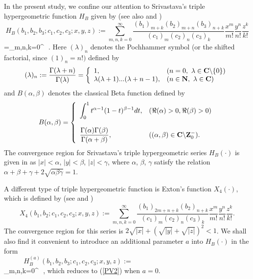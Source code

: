 In the present study, we confine our attention to Srivastava's triple hypergeometric function $H_{B}$ given by \cite[p. 43, 1.5(11) to 1.5(13)]{AB37} (see also \cite{AB34} and \cite[p.~68]{AB36})
\[
H_{B}(b_{1},b_{2},b_{3};c_{1},c_{2},c_{3};x,y,z)
:=\sum_{m,n,k=0}^{\infty}\frac{(b_{1})_{m+k}(b_{2})_{m+n}(b_{3})_{n+k}}{(c_{1})_{m}(c_{2})_{n}(c_{3})_{k}}
\frac{x^{m}}{m!}\frac{y^{n}}{n!}\frac{z^{k}}{k!}\]
\bee\label{PV2}
=\sum_{m,n,k=0}^{\infty}\,\,
.
\ee
Here $(\lambda)_{n}$ denotes the Pochhammer symbol (or the shifted factorial,
 since $(1)_{n}=n!)$  defined by
\[
(\lambda)_n:=\frac{\Gamma(\lambda+n)}{\Gamma(\lambda)}=\left\{\begin{array}{ll}1, & (n=0,\ \lambda\in{\bf C}\backslash\{0\})\\
\lambda(\lambda+1)...(\lambda+n-1),  & (n\in{\bf N},~\lambda\in{\bf C}) 
 \end{array}\right.
\]
and $B(\alpha, \beta)$ denotes the classical Beta function  defined by \cite[(5.12.1)]{AB26}
\begin{equation}\label{ES5}
B(\alpha, \beta)=\left\{\begin{array}{ll} \displaystyle{\int_{0}^{1}t^{\alpha-1}(1-t)^{\beta-1}dt}, & (\Re(\alpha)>0,  \Re(\beta)>0)\\
\\
\displaystyle{\frac{\Gamma(\alpha)\Gamma(\beta)}{\Gamma(\alpha+\beta)}}, & ( (\alpha,\beta)\in{\bf C}\backslash {\bf Z}_{0}^{-}). \end{array}\right.
\end{equation}
The convergence region for Srivastava's triple hypergeometric series $H_{B}(\cdot)$ is given in \cite[ p.243]{ab22}
as $|x|<\alpha$, $|y|<\beta$, $|z|<\gamma$, where $\alpha$, $\beta$, $\gamma$ satisfy the relation $\alpha+\beta+\gamma+2\sqrt{\alpha\beta\gamma}=1$. 


A different type of triple hypergeometric function is Exton's  function $ X_{4}(\cdot)$, which is defined by (see \cite{AB19} and \cite[p.~84, Entry (45a)]{AB37})
\begin{equation}\label{PV3}
X_{4}(b_{1},b_{2};c_{1},c_{2},c_{3};x,y,z):=\sum_{m,n,k=0}^{\infty}\frac{(b_{1})_{2m+n+k}(b_{2})_{n+k}}{(c_{1})_{m}(c_{2})_{n}(c_{3})_{k}}
\frac{x^{m}}{m!}\frac{y^{n}}{n!}\frac{z^{k}}{k!}.
\end{equation}
The convergence region for this series is $2\sqrt{|x|}+(\sqrt{|y|}+\sqrt{|z|})^{2}<1$.
We shall also find it convenient to introduce an additional parameter $a$ into $H_B(\cdot)$ in the form
\[H_{B}^{(a)}(b_{1},b_{2},b_{3};c_{1},c_{2},c_{3};x,y,z):=\hspace{6cm}\]
\bee\label{PV2a}
\sum_{m,n,k=0}^{\infty}\,\,
, 
\ee 
which reduces to (\ref{PV2}) when $a=0$.

